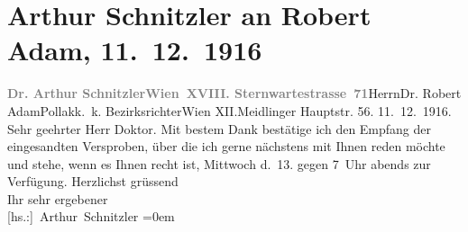 

         
         \renewcommand{\erwaehntePersonen}{Personen: Robert Adam}
         \renewcommand{\erwaehnteOrte}{Orte: Meidlinger Hauptstraße, Sternwartestraße, VIII., Josefstadt, Wien, XII., Meidling}
         \renewcommand{\erwaehnteWerke}{}
               \section[Arthur Schnitzler an Robert Adam, 11. 12. 1916]{ Arthur Schnitzler an Robert Adam, 11. 12. 1916}\nopagebreak{}\rehead{ }\begin{ledgroupsized}[t]{13cm}\normalsize\beginnumbering \toendnotes[C]{\smallbreak\pagebreak[2]} 
\pstart{}{\pb}\textcolor{gray}{\textbf{Dr. Arthur Schnitzler}}\pend{}\pstart{}\textcolor{gray}{\textbf{Wien XVIII. Sternwartestrasse 71}}\pend{}{\bigskip}\pstart{}Herrn\pend{}\pstart{}Dr. Robert Adam\pend{}\pstart{}Pollak\pend{}\pstart{}k. k. Bezirksrichter\pend{}\pstart{}Wien XII.\pend{}\pstart{}Meidlinger Hauptstr. 56.\pend{}{\bigskip}\pstart
           \raggedleft{}{\pb}11. 12. 1916.\pend
           \pstart{}Sehr geehrter Herr Doktor.\pend\pstart
           Mit bestem Dank bestätige ich den Empfang der eingesandten Versproben, über die ich
               gerne nächstens mit Ihnen reden möchte und stehe, wenn es Ihnen recht ist,
                  Mittwoch d. 13. gegen 7 Uhr abends zur Verfügung.\pend
           \pstart
           Herzlichst grüssend{\\[\baselineskip]}Ihr sehr ergebener{\\[\baselineskip]}\spacefill\mbox{{[}hs.:{]} Arthur Schnitzler}\pend
           \leftskip=0em{}
         
         \endnumbering{}\end{ledgroupsized}  \newcommand{\dateiname}{L02250}\newcommand{\titel}{Arthur Schnitzler an Robert Adam, 11. 12. 1916}\newcommand{\editorInnen}{Martin Anton Müller und Gerd-Hermann Susen}
      